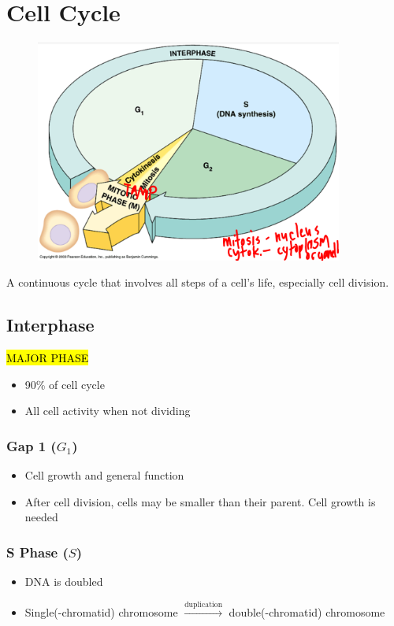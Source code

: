 \documentclass[a4paper,12pt]{article}
\begin{document}
\section{Cell Cycle}
\begin{figure}[H] \includegraphics[width=0.9\textwidth]{cellcycle} \end{figure}

A continuous cycle that involves all steps of a cell's life, especially cell division.

\subsection{Interphase}

\hl{MAJOR PHASE}

\begin{itemize}
    \item{90\% of cell cycle}
    \item{All cell activity when not dividing}
\end{itemize}

\subsubsection{Gap 1 ($G_1$)}
\begin{itemize}
    \item{Cell growth and general function}
    \item{After cell division, cells may be smaller than their parent. Cell growth is needed}
\end{itemize}

\subsubsection{S Phase ($S$)}
\begin{itemize}
    \item{DNA is doubled}
    \item{Single(-chromatid) chromosome $\xrightarrow{\textrm{duplication}}$ double(-chromatid) chromosome}
\end{itemize}
\end{document}
